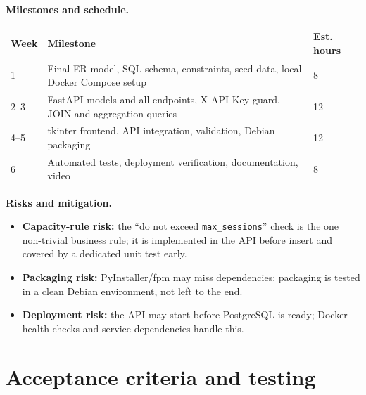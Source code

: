\documentclass[11pt,a4paper]{article}
\begin{document}
\textbf{Milestones and schedule.}

\renewcommand{\arraystretch}{1.2}
\begin{tabularx}{\linewidth}{@{}p{1.4cm}Xp{1.8cm}@{}}
\toprule
\textbf{Week} & \textbf{Milestone} & \textbf{Est. hours} \\
\midrule
1     & Final ER model, SQL schema, constraints, seed data, local Docker Compose setup & 8 \\
2--3  & FastAPI models and all endpoints, X-API-Key guard, JOIN and aggregation queries & 12 \\
4--5  & tkinter frontend, API integration, validation, Debian packaging & 12 \\
6     & Automated tests, deployment verification, documentation, video & 8 \\
\bottomrule
\end{tabularx}

\textbf{Risks and mitigation.}
\begin{itemize}[topsep=2pt]
  \item \textbf{Capacity-rule risk:} the ``do not exceed \texttt{max\_sessions}''
        check is the one non-trivial business rule; it is implemented in the API
        before insert and covered by a dedicated unit test early.
  \item \textbf{Packaging risk:} PyInstaller/fpm may miss dependencies;
        packaging is tested in a clean Debian environment, not left to the end.
  \item \textbf{Deployment risk:} the API may start before PostgreSQL is ready;
        Docker health checks and service dependencies handle this.
\end{itemize}

\section{Acceptance criteria and testing}
\end{document}
